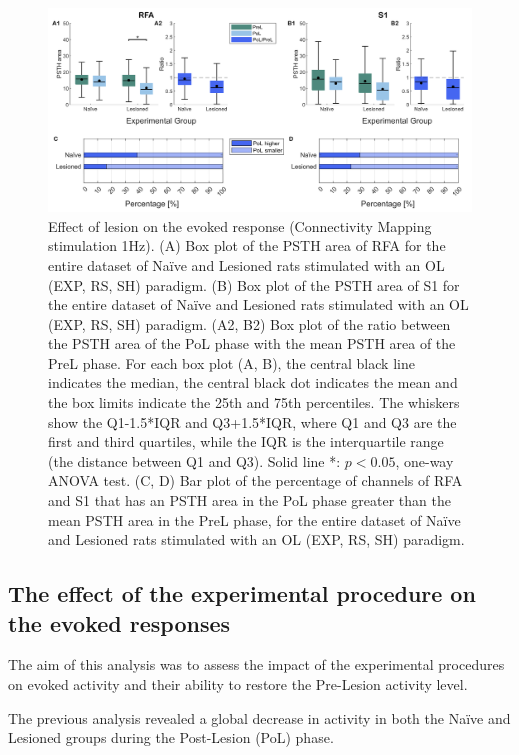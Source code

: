 \begin{figure}[ht!]
    \begin{center}
    \includegraphics[width=0.90\linewidth]{Figure/Ratio PSTH area separate/ratio PoL-PreL PSTH area 1Hz.jpg}
    \end{center}
    \caption{Effect of lesion on the evoked response (Connectivity Mapping stimulation 1Hz). (A) Box plot of the PSTH area of RFA for the entire dataset of Naïve and Lesioned rats stimulated with an OL (EXP, RS, SH) paradigm. (B) Box plot of the PSTH area of S1 for the entire dataset of Naïve and Lesioned rats stimulated with an OL (EXP, RS, SH) paradigm. (A2, B2) Box plot of the ratio between the PSTH area of the PoL phase with the mean PSTH area of the PreL phase. For each box plot (A, B), the central black line indicates the median, the central black dot indicates the mean and the box limits indicate the 25th and 75th percentiles. The whiskers show the Q1-1.5*IQR and Q3+1.5*IQR, where Q1 and Q3 are the first and third quartiles, while the IQR is the interquartile range (the distance between Q1 and Q3). Solid line *: $p<0.05$, one-way ANOVA test. (C, D) Bar plot of the percentage of channels of RFA and S1 that has an PSTH area in the PoL phase greater than the mean PSTH area in the PreL phase, for the entire dataset of Naïve and Lesioned rats stimulated with an OL (EXP, RS, SH) paradigm.}
    \label{fig:ratio PoL-PreL PSTH area 1Hz}
\end{figure}

\clearpage
\subsection{The effect of the experimental procedure on the evoked responses}

The aim of this analysis was to assess the impact of the experimental procedures on evoked activity and their ability to restore the Pre-Lesion activity level.

The previous analysis revealed a global decrease in activity in both the Naïve and Lesioned groups during the Post-Lesion (PoL) phase.

